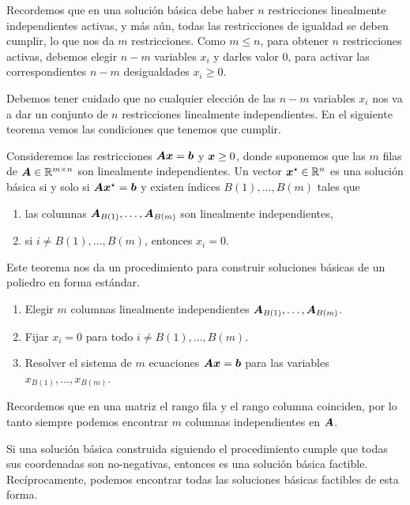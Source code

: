 Recordemos que en una solución básica debe haber $n$ restricciones linealmente independientes activas, y más aún, todas las restricciones de igualdad se deben cumplir, lo que nos da $m$ restricciones. Como $m \le n$, para obtener $n$ restricciones activas, debemos elegir $n - m$ variables $x_i$ y darles valor $0$, para activar las correspondientes $n-m$ desigualdades $x_i \ge 0$.

Debemos tener cuidado que no cualquier elección de las $n-m$ variables $x_i$ nos va a dar un conjunto de $n$ restricciones linealmente independientes. En el siguiente teorema vemos las condiciones que tenemos que cumplir.

\begin{theorem}
Consideremos las restricciones $\bm{A}\bm{x} = \bm{b}$ y $\bm{x} \ge 0$, donde suponemos que las $m$ filas de $\bm{A} \in \mathbb{R}^{m \times n}$ son linealmente independientes.
Un vector $\bm{x}^\star \in \mathbb{R}^n$ es una solución básica si y solo si $\bm{A}\bm{x}^\star = \bm{b}$ y existen índices $B(1), \dots, B(m)$ tales que
\begin{enumerate}
\item las columnas $\bm{A}_{B(1)}, \dots, \bm{A}_{B(m)}$ son linealmente independientes,
\item si $i \neq B(1), \dots, B(m)$, entonces $x_i = 0$.
\end{enumerate}
\end{theorem}

Este teorema nos da un procedimiento para construir soluciones básicas de un poliedro en forma estándar.

\begin{enumerate}
\item Elegir $m$ columnas linealmente independientes $\bm{A}_{B(1)}, \dots, \bm{A}_{B(m)}$.
\item Fijar $x_i = 0$ para todo $i \neq B(1), \dots, B(m)$.
\item Resolver el sistema de $m$ ecuaciones $\bm{A}\bm{x} = \bm{b}$ para las variables $x_{B(1)}, \dots, x_{B(m)}$.
\end{enumerate}

Recordemos que en una matriz el rango fila y el rango columna coinciden, por lo tanto siempre podemos encontrar $m$ columnas independientes en $\bm{A}$.

Si una solución básica construida siguiendo el procedimiento cumple que todas sus coordenadas son no-negativas, entonces es una solución básica factible. Recíprocamente, podemos encontrar todas las soluciones básicas factibles de esta forma.

